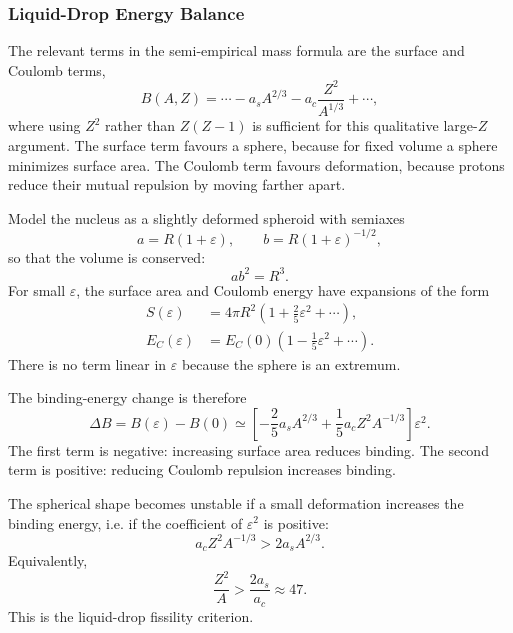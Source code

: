 \subsubsection*{Liquid-Drop Energy Balance}
The relevant terms in the semi-empirical mass formula are the surface and
Coulomb terms,
\begin{equation}
  B(A,Z)=\cdots -a_s A^{2/3}-a_c\frac{Z^2}{A^{1/3}}+\cdots,
\end{equation}
where using $Z^2$ rather than $Z(Z-1)$ is sufficient for this qualitative
large-$Z$ argument. The surface term favours a sphere, because for fixed volume
a sphere minimizes surface area. The Coulomb term favours deformation, because
protons reduce their mutual repulsion by moving farther apart.

Model the nucleus as a slightly deformed spheroid with semiaxes
\begin{equation}
  a=R(1+\varepsilon),
  \qquad
  b=R(1+\varepsilon)^{-1/2},
\end{equation}
so that the volume is conserved:
\begin{equation}
  ab^2=R^3.
\end{equation}
For small $\varepsilon$, the surface area and Coulomb energy have expansions of
the form
\begin{align}
  S(\varepsilon)
  &=4\pi R^2\left(1+\frac{2}{5}\varepsilon^2+\cdots\right),
  \label{eq:lec11:surface_expansion}\\
  E_C(\varepsilon)
  &=E_C(0)\left(1-\frac{1}{5}\varepsilon^2+\cdots\right).
  \label{eq:lec11:coulomb_expansion}
\end{align}
There is no term linear in $\varepsilon$ because the sphere is an extremum.

The binding-energy change is therefore
\begin{equation}
  \Delta B
  =B(\varepsilon)-B(0)
  \simeq
  \left[-\frac{2}{5}a_sA^{2/3}
  +\frac{1}{5}a_cZ^2A^{-1/3}\right]\varepsilon^2.
  \label{eq:lec11:deltaB_deformation}
\end{equation}
The first term is negative: increasing surface area reduces binding. The second
term is positive: reducing Coulomb repulsion increases binding.

The spherical shape becomes unstable if a small deformation increases the
binding energy, i.e. if the coefficient of $\varepsilon^2$ is positive:
\begin{equation}
  a_cZ^2A^{-1/3}>2a_sA^{2/3}.
\end{equation}
Equivalently,
\begin{equation}
  \boxed{\frac{Z^2}{A}>\frac{2a_s}{a_c}\approx 47.}
  \label{eq:lec11:fissility_condition}
\end{equation}
This is the liquid-drop fissility criterion.

